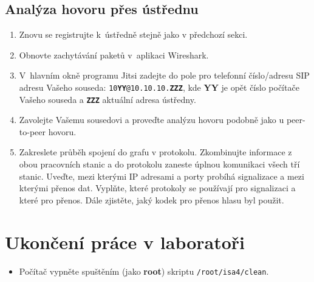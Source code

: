 \subsection{Analýza hovoru přes ústřednu}
\begin{enumerate}
    \item Znovu se registrujte k ústředně stejně jako v předchozí sekci.
    \item Obnovte zachytávání paketů v aplikaci Wireshark.
    \item V hlavním okně programu Jitsi zadejte do pole pro telefonní číslo/adresu SIP adresu Vašeho souseda: {\tt 10{\bf YY}@10.10.10.{\bf ZZZ}}, kde {\bf YY} je opět číslo počítače Vašeho souseda a {\tt\bf ZZZ} aktuální adresa ústředny.
    \item Zavolejte Vašemu sousedovi a proveďte analýzu hovoru podobně jako u peer-to-peer hovoru.
    \item Zakreslete průběh spojení do grafu v protokolu.
    Zkombinujte informace z obou pracovních stanic a do protokolu zaneste úplnou komunikaci všech tří stanic.
    Uveďte, mezi kterými IP adresami a porty probíhá signalizace a mezi kterými přenos dat.
    Vyplňte, které protokoly se používají pro signalizaci a které pro přenos.
    Dále zjistěte, jaký kodek pro přenos hlasu byl použit.
\end{enumerate}

\section{Ukončení práce v laboratoři}
\begin{itemize}
  \item Počítač vypněte spuštěním (jako {\bf root}) skriptu {\tt /root/isa4/clean}.
\end{itemize}
